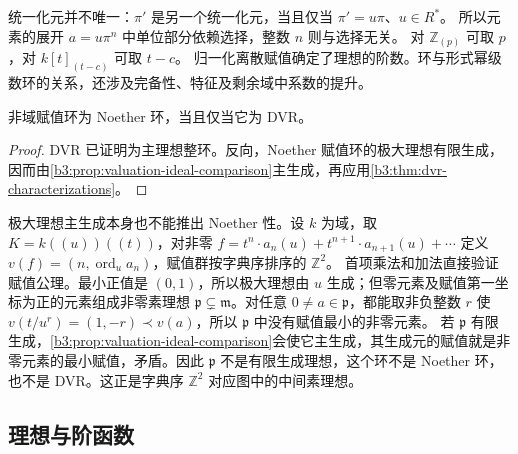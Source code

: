 统一化元并不唯一：\(\pi'\) 是另一个统一化元，当且仅当 \(\pi'=u\pi\)、\(u\in R^*\)。 所以元素的展开 \(a=u\pi^n\) 中单位部分依赖选择，整数 \(n\) 则与选择无关。 对 \(\mathbb Z_{(p)}\) 可取 \(p\)，对 \(k[t]_{(t-c)}\) 可取 \(t-c\)。 归一化离散赋值确定了理想的阶数。环与形式幂级数环的关系，还涉及完备性、特征及剩余域中系数的提升。

\begin{proposition}\label{b3:prop:noether-valuation-dvr}
	非域赋值环为 Noether 环，当且仅当它为 DVR。
\end{proposition}
\begin{proof}
	DVR 已证明为主理想整环。反向，Noether 赋值环的极大理想有限生成，因而由\cref{b3:prop:valuation-ideal-comparison}主生成，再应用\cref{b3:thm:dvr-characterizations}。
\end{proof}

极大理想主生成本身也不能推出 Noether 性。设 \(k\) 为域，取 \(K=k(\!(u)\!)(\!(t)\!)\)，对非零 \(f=t^n\cdot a_n(u)+t^{n+1}\cdot a_{n+1}(u)+\cdots\) 定义 \(v(f)=(n,\operatorname{ord}_u a_n)\)，赋值群按字典序排序的 \(\mathbb Z^2\)。 首项乘法和加法直接验证赋值公理。最小正值是 \((0,1)\)，所以极大理想由 \(u\) 生成；但零元素及赋值第一坐标为正的元素组成非零素理想 \(\mathfrak p\subsetneq\mathfrak m\)。对任意 \(0\ne a\in\mathfrak p\)，都能取非负整数 \(r\) 使 \(v(t/u^r)=(1,-r)\prec v(a)\)，所以 \(\mathfrak p\) 中没有赋值最小的非零元素。 若 \(\mathfrak p\) 有限生成，\cref{b3:prop:valuation-ideal-comparison}会使它主生成，其生成元的赋值就是非零元素的最小赋值，矛盾。因此 \(\mathfrak p\) 不是有限生成理想，这个环不是 Noether 环，也不是 DVR。这正是字典序 \(\mathbb Z^2\) 对应图中的中间素理想。

\subsection{理想与阶函数}
\label{b3:subsec:1002:03}

